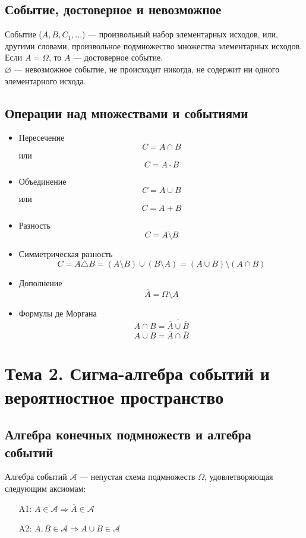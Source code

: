 \documentclass[12pt]{article}
\begin{document}
\subsection{Событие, достоверное и невозможное}
Событие ($A, B, C_1, ... $) --- произвольный набор элементарных исходов,
или, другими словами, произвольное подмножество множества элементарных исходов. \\
Если $A = \Omega$, то $A$ --- достоверное событие. \\
$\varnothing$ --- невозможное событие, не происходит никогда, не содержит ни одного элементарного исхода.

\subsection{Операции над множествами и событиями}
\begin{itemize}
	\item Пересечение \\
	      \[C = A \cap B\]
	      или
	      \[C = A \cdot B\]
	\item Объединение \\
	      \[C = A \cup B\]
	      или
	      \[C = A + B\]
	\item Разность \\
	      \[C = A \setminus B\]
	\item Симметрическая разность \\
	      \[C = A \triangle B = (A \setminus B) \cup (B \setminus A) = (A \cup B) \setminus (A \cap B)\]
	\item Дополнение \\
	      \[\overline{A} = \Omega \setminus A\]
	\item Формулы де Моргана \\
	      \[A \cap B = \overline{\overline{A} \cup \overline{B}}\]
	      \[A \cup B = \overline{\overline{A} \cap \overline{B}}\]
\end{itemize}

\section{Тема 2. Сигма-алгебра событий и вероятностное пространство}

\subsection{Алгебра конечных подмножеств и алгебра событий}
Алгебра событий $\mathcal{A}$ --- непустая схема подмножеств $\Omega$, удовлетворяющая следующим аксиомам:
\begin{itemize}
	\item[A1:] $A \in \mathcal{A} \Rightarrow \overline{A} \in \mathcal{A}$
	\item[A2:] $A,B \in \mathcal{A} \Rightarrow A \cup B \in \mathcal{A}$
\end{itemize}
\end{document}
